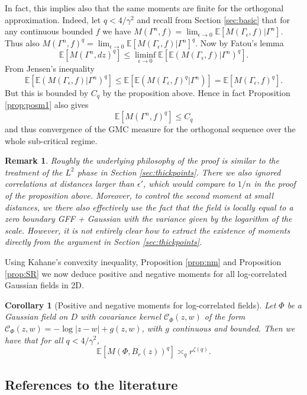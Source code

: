 \documentclass[11pt]{amsart}
\newtheorem{rem}[thm]{Remark}
\newtheorem{cor}[thm]{Corollary}
\newcommand{\C}{\mathcal C}
\newcommand{\E}{\mathbb E}
\renewcommand{\1}{\mathbf 1}
\newcommand{\eps}{\epsilon}
\begin{document}
In fact, this implies also that the same moments are finite for the orthogonal approximation. Indeed, let $q < 4/\gamma^2$ and recall from Section \ref{sec:basic} that for any continuous bounded $f$ we have $M(\Gamma^n,f) = \lim_{\eps \to 0} \E\left[M(\Gamma_\eps,f)|\Gamma^n\right]$. Thus also $M(\Gamma^n,f)^q = \lim_{\eps \to 0} \E\left[M (\Gamma_\eps,f)|\Gamma^n\right]^q$. Now by Fatou's lemma
$$\E \left[ M(\Gamma^n, dz)^q\right] \leq \liminf_{\eps \to 0} \E \left[ \E\left(M(\Gamma_\eps,f)|\Gamma^n\right)^q\right].$$
From Jensen's inequality $$\E \left[ \E\left(M(\Gamma_\eps,f)|\Gamma^n\right)^q\right] \leq \E \left[ \E\left(M(\Gamma_\eps,f)^q|\Gamma^n\right)\right] = \E\left[M(\Gamma_\eps,f)^q\right].$$
But this is bounded by $C_q$ by the proposition above. Hence in fact Proposition \ref{prop:posm1} also gives 
$$\E\left[ M(\Gamma^n,f)^q\right] \leq C_q$$
and thus convergence of the GMC measure for the orthogonal sequence over the whole sub-critical regime.

\begin{rem}
	Roughly the underlying philosophy of the proof is similar to the treatment of the $L^2$ phase in Section \ref{sec:thickpoints}. There we also ignored correlations at distances larger than $\eps'$, which would compare to $1/n$ in the proof of the proposition above. Moreover, to control the second moment at small distances, we there also effectively use the fact that the field is locally equal to a zero boundary GFF + Gaussian with the variance given by the logarithm of the scale. However, it is not entirely clear how to extract the existence of moments directly from the argument in Section \ref{sec:thickpoints}.
\end{rem}

Using Kahane's convexity inequality, Proposition \ref{prop:nm} and Proposition \ref{prop:SR} we now deduce positive and negative moments for all log-correlated Gaussian fields in 2D.
\begin{cor}[Positive and negative moments for log-correlated fields]
Let $\Phi$ be a Gaussian field on $D$ with covariance kernel $\C_\Phi(z,w)$ of the form $\C_\Phi(z,w) = - \log |z-w| + g(z,w)$, with $g$ continuous and bounded. Then we have that for all $q < 4/\gamma^2$, 
$$\E \left[M(\Phi, B_r(z))^q\right] \asymp_q r^{\zeta(q)}.$$
\end{cor}

\subsection*{References to the literature}
\end{document}
